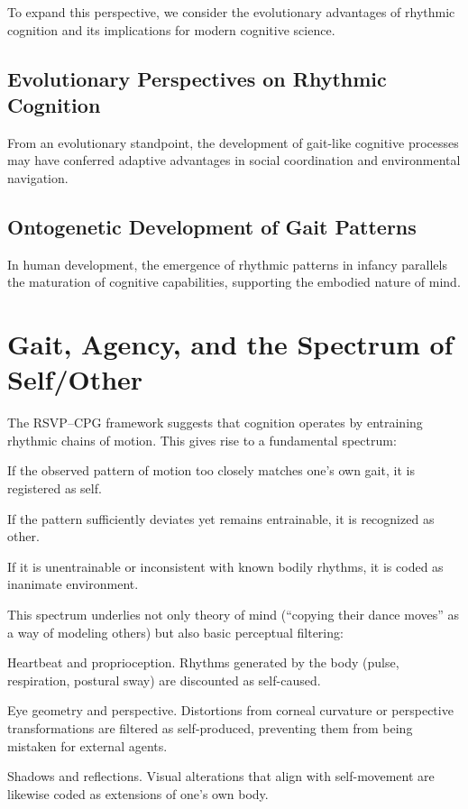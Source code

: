\documentclass{article}
\begin{document}
To expand this perspective, we consider the evolutionary advantages of rhythmic cognition and its implications for modern cognitive science.

\subsection{Evolutionary Perspectives on Rhythmic Cognition}

From an evolutionary standpoint, the development of gait-like cognitive processes may have conferred adaptive advantages in social coordination and environmental navigation.

\subsection{Ontogenetic Development of Gait Patterns}

In human development, the emergence of rhythmic patterns in infancy parallels the maturation of cognitive capabilities, supporting the embodied nature of mind.

\section{Gait, Agency, and the Spectrum of Self/Other}

The RSVP--CPG framework suggests that cognition operates by entraining rhythmic chains of motion. This gives rise to a fundamental spectrum:

If the observed pattern of motion too closely matches one’s own gait, it is registered as self.

If the pattern sufficiently deviates yet remains entrainable, it is recognized as other.

If it is unentrainable or inconsistent with known bodily rhythms, it is coded as inanimate environment.

This spectrum underlies not only theory of mind (“copying their dance moves” as a way of modeling others) but also basic perceptual filtering:

Heartbeat and proprioception. Rhythms generated by the body (pulse, respiration, postural sway) are discounted as self-caused.

Eye geometry and perspective. Distortions from corneal curvature or perspective transformations are filtered as self-produced, preventing them from being mistaken for external agents.

Shadows and reflections. Visual alterations that align with self-movement are likewise coded as extensions of one’s own body.
\end{document}
